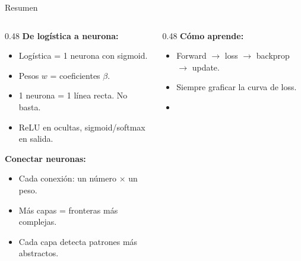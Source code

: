 \documentclass[aspectratio=169, 11pt]{beamer}
\begin{document}
\begin{frame}[shrink=10]{Resumen}
  \vspace{-4pt}
  \begin{columns}[T]
    \begin{column}{0.48\textwidth}
      {\footnotesize\bfseries\color{arcaDark} De log\'istica a neurona:}
      \vspace{3pt}
      {\footnotesize
      \begin{itemize}\setlength{\itemsep}{2pt}
        \item[{\color{codeGreen}\faCheckCircle}]
          Log\'istica = 1 neurona con sigmoid.
        \item[{\color{codeGreen}\faCheckCircle}]
          Pesos $w$ = coeficientes $\beta$.
        \item[{\color{codeGreen}\faCheckCircle}]
          1 neurona = 1 l\'inea recta. No basta.
        \item[{\color{codeGreen}\faCheckCircle}]
          ReLU en ocultas, sigmoid/softmax en salida.
      \end{itemize}
      }
      \vspace{3pt}
      {\footnotesize\bfseries\color{codeBlue} Conectar neuronas:}
      \vspace{3pt}
      {\footnotesize
      \begin{itemize}\setlength{\itemsep}{2pt}
        \item[{\color{codeGreen}\faCheckCircle}]
          Cada conexi\'on: un n\'umero $\times$ un peso.
        \item[{\color{codeGreen}\faCheckCircle}]
          M\'as capas = fronteras m\'as complejas.
        \item[{\color{codeGreen}\faCheckCircle}]
          Cada capa detecta patrones m\'as abstractos.
      \end{itemize}
      }
    \end{column}
    \begin{column}{0.48\textwidth}
      {\footnotesize\bfseries\color{arcaRed} C\'omo aprende:}
      \vspace{3pt}
      {\footnotesize
      \begin{itemize}\setlength{\itemsep}{2pt}
        \item[{\color{codeGreen}\faCheckCircle}]
          Forward $\to$ loss $\to$ backprop $\to$ update.
        \item[{\color{codeGreen}\faCheckCircle}]
          Siempre graficar la curva de loss.
        \item[{\color{codeGreen}\faCheckCircle}]

\end{itemize}}
\end{column}
\end{columns}
\end{frame}
\end{document}
